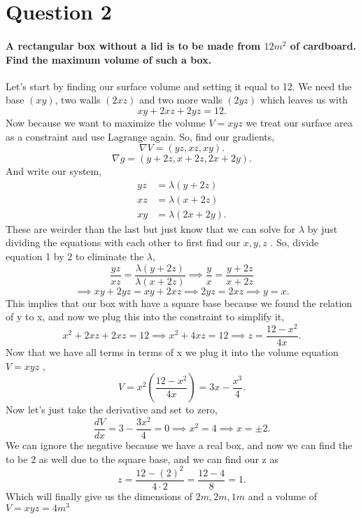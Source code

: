 \section{Question 2}%
\label{sec: Question 2 }
\paragraph{A rectangular box without a lid is to be made from $ 12m^2 $ of cardboard. Find the maximum volume of such a box.}
Let's start by finding our surface volume and setting it equal to 12. We need the base $ \left( xy \right)  $, two walls $ \left( 2xz \right)  $ and two more walls $ \left( 2yz \right)  $ which leaves us with
\[
xy+2xz+2yz=12
.\] 
Now because we want to maximize the volume $ V=xyz $  we treat our surface area as a constraint and use Lagrange again. So, find our gradients,
\[
\nabla V = \left( yz, xz, xy \right) 
.\] 
\[
\nabla g = \left( y+2z, x+2z, 2x+2y \right) 
.\] 
And write our system,
\begin{align*}
yz &= \lambda\left( y+2z \right)  \\
xz &= \lambda\left( x+2z \right)  \\
xy &= \lambda\left( 2x+2y \right)
.\end{align*}
These are weirder than the last but just know that we can solve for $ \lambda $ by just dividing the equations with each other to first find our $ x,y,z $ . So, divide equation 1 by 2 to eliminate the $ \lambda $,
\[
\frac{ yz }{ xz }= \frac{ \lambda\left( y+2z \right)  }{ \lambda\left( x+2z \right)  } \implies \frac{ y }{ x } = \frac{ y+2z }{ x+2z } 
\] 
\[
\implies xy+2yz = xy+2xz \implies 2yz=2xz \implies y=x
.\] 
This implies that our box with have a square base because we found the relation of y to x, and now we plug this into the constraint to simplify it,
\[
x^2+2xz+2xz = 12 \implies x^2+4xz = 12 \implies z = \frac{ 12-x^2 }{ 4x }
.\] 
Now that we have all terms in terms of x we plug it into the volume equation $ V=xyz $ ,
\[
V= x^2\left( \frac{ 12-x^2 }{ 4x } \right) = 3x-\frac{ x^3 }{ 4 } 
.\] 
Now let's just take the derivative and set to zero,
\[
\frac{ dV }{ dx }= 3-\frac{ 3x^2 }{ 4 }=0 \implies x^2=4 \implies x= \pm 2
.\] 
We can ignore the negative because we have a real box, and now we can find the to be 2 as well due to the square base, and we can find our z as
\[
z=\frac{ 12-\left( 2 \right) ^2 }{ 4\cdot 2 }= \frac{ 12-4 }{ 8 }= 1
.\] 
Which will finally give us the dimensions of $ 2m,2m,1m $ and a volume of $ V=xyz=4m^3 $
